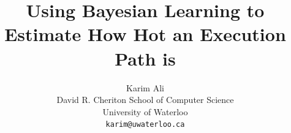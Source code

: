\documentclass[10pt,twocolumn,letterpaper]{article}
\begin{document}
\title{Using Bayesian Learning to Estimate How Hot an Execution Path is}

\author{Karim Ali\\
David R. Cheriton School of Computer Science\\
University of Waterloo\\
{\tt\small karim@uwaterloo.ca}}

\maketitle
\thispagestyle{empty}

\begin{abstract}
   
\end{abstract}

\end{document}

